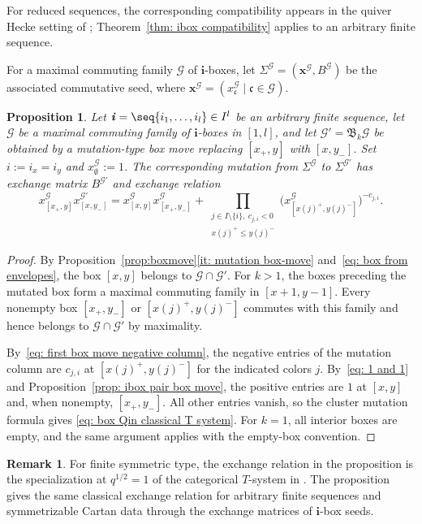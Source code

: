 \documentclass[12pt, leqno]{amsart}
\numberwithin{equation}{section}
\theoremstyle{plain}
\newtheorem{proposition}[lemma]{Proposition}
\theoremstyle{definition}
\newtheorem{remark}[lemma]{Remark}
\renewcommand{\le}{\leqslant}
\newcommand{\seteq}{\mathbin{:=}}
\newcommand{\ii}{ \textbf{\textit{i}}}
\newcommand{\frakB}{\mathfrak{B}}
\newcommand{\frakc}{\mathfrak{c}}
\newcommand{\bfi}{\mathbf{i}}
\newcommand{\bfx}{\mathbf{x}}
\newcommand{\calG}{\mathcal{G}}
\begin{document}
For reduced sequences, the corresponding compatibility appears in
the quiver Hecke setting of \cite{KK24}; Theorem~\ref{thm: ibox compatibility} applies to an
arbitrary finite sequence.

\smallskip

For a maximal commuting family $\calG$ of $\bfi$-boxes, let
$\Sigma^\calG=(\bfx^\calG,B^\calG)$ be the associated commutative
seed, where $\bfx^\calG=(x^\calG_\frakc\mid\frakc\in\calG)$.

\begin{proposition}
\label{lem: box classical T system}
Let $\ii=\seq{i_1,\ldots,i_l}\in I^l$ be an arbitrary finite sequence,
let $\calG$ be a maximal commuting family of $\bfi$-boxes in $[1,l]$,
and let $\calG'=\frakB_k\calG$ be obtained by a mutation-type box move
replacing $[x_+,y]$ with $[x,y_-]$.
Set $i\seteq i_x=i_y$ and $x^\calG_\emptyset\seteq1$.
The corresponding mutation from $\Sigma^\calG$ to $\Sigma^{\calG'}$
has exchange matrix $B^{\calG'}$ and exchange relation
\begin{equation}
x^{\calG}_{[x_+,y]}x^{\calG'}_{[x,y_-]}
=x^\calG_{[x,y]}x^\calG_{[x_+,y_-]}+
\prod_{\substack{j\in I\setminus\{i\},\ c_{j,i}<0\\ x(j)^+\le y(j)^-}}
\bigl(x^\calG_{[x(j)^+,y(j)^-]}\bigr)^{-c_{j,i}}.
\label{eq: box Qin classical T system}
\end{equation}
\end{proposition}

\begin{proof}
By Proposition~\ref{prop:boxmove}\eqref{it: mutation box-move}
and~\eqref{eq: box from envelopes}, the box $[x,y]$ belongs to
$\calG\cap\calG'$. For $k>1$, the boxes preceding the mutated box
form a maximal commuting family in $[x+1,y-1]$. Every nonempty box
$[x_+,y_-]$ or $[x(j)^+,y(j)^-]$ commutes with this family and hence
belongs to $\calG\cap\calG'$ by maximality.

By~\eqref{eq: first box move negative column}, the negative entries
of the mutation column are $c_{j,i}$ at $[x(j)^+,y(j)^-]$ for the
indicated colors $j$. By~\eqref{eq: 1 and 1} and
Proposition~\ref{prop: ibox pair box move}, the positive entries
are $1$ at $[x,y]$ and, when nonempty, $[x_+,y_-]$.
All other entries vanish, so the cluster mutation formula gives
\eqref{eq: box Qin classical T system}.
For $k=1$, all interior boxes are empty, and the same argument
applies with the empty-box convention.
\end{proof}

\begin{remark}
For finite symmetric type, the exchange relation in
the proposition is the specialization at $q^{1/2}=1$ of the categorical $T$-system in
\cite{KKOP24A,KKOP25M,KK24}. 
The proposition gives the same classical exchange relation for arbitrary finite sequences and symmetrizable Cartan data through the
exchange matrices of $\bfi$-box seeds. 
\end{remark}
\end{document}
